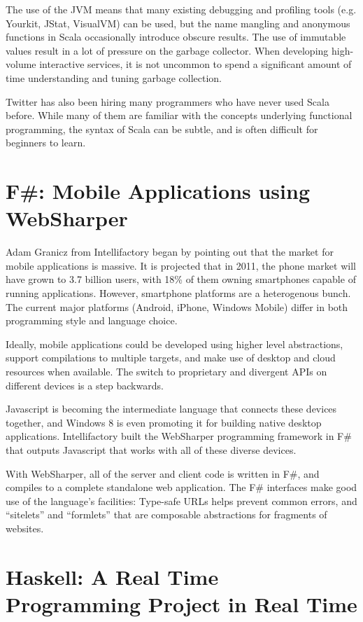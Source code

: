 \documentclass{jfp1}
\begin{document}
The use of the JVM means that many existing debugging and profiling tools (e.g.
Yourkit, JStat, VisualVM) can be used, but the name mangling and anonymous
functions in Scala occasionally introduce obscure results.  The use of
immutable values result in a lot of pressure on the garbage collector. When
developing high-volume interactive services, it is not uncommon to spend a
significant amount of time understanding and tuning garbage collection.

Twitter has also been hiring many programmers who have never used Scala before.
While many of them are familiar with the concepts underlying functional
programming, the syntax of Scala can be subtle, and is often difficult for beginners
to learn.

\section{F\#: Mobile Applications using WebSharper}

Adam Granicz from Intellifactory began by pointing out that the market for
mobile applications is massive.  It is projected that in 2011, the phone market
will have grown to 3.7 billion users, with 18\% of them owning smartphones
capable of running applications.  However, smartphone platforms are a
heterogenous bunch. The current major platforms (Android, iPhone, Windows
Mobile) differ in both programming style and language choice.

Ideally, mobile applications could be developed using higher level
abstractions, support compilations to multiple targets, and make use of desktop
and cloud resources when available. The switch to proprietary and divergent
APIs on different devices is a step backwards.

Javascript is becoming the intermediate language that connects these devices
together, and Windows 8 is even promoting it for building native desktop
applications. Intellifactory built the WebSharper programming framework in F\#
that outputs Javascript that works with all of these diverse devices.

With WebSharper, all of the server and client code is written in F\#, and
compiles to a complete standalone web application. The F\# interfaces make good
use of the language's facilities: Type-safe URLs helps prevent common errors,
and ``sitelets'' and ``formlets'' that are composable abstractions for
fragments of websites.

\section{Haskell: A Real Time Programming Project in Real Time}
\end{document}
